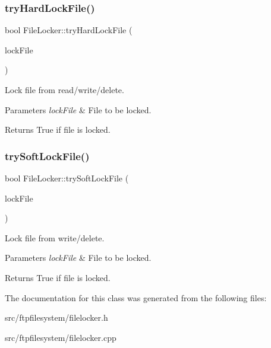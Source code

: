 \subsubsection{\texorpdfstring{try\+Hard\+Lock\+File()}{tryHardLockFile()}}
{\footnotesize\ttfamily bool File\+Locker\+::try\+Hard\+Lock\+File (\begin{DoxyParamCaption}\item[{const Q\+File\+Info \&}]{lock\+File }\end{DoxyParamCaption})\hspace{0.3cm}{\ttfamily [static]}}



Lock file from read/write/delete. 


\begin{DoxyParams}{Parameters}
{\em lock\+File} & File to be locked. \\
\hline
\end{DoxyParams}
\begin{DoxyReturn}{Returns}
True if file is locked. 
\end{DoxyReturn}
\mbox{\label{classFileLocker_a107060898062f6990b58d0cb102551ac}} 
\subsubsection{\texorpdfstring{try\+Soft\+Lock\+File()}{trySoftLockFile()}}
{\footnotesize\ttfamily bool File\+Locker\+::try\+Soft\+Lock\+File (\begin{DoxyParamCaption}\item[{const Q\+File\+Info \&}]{lock\+File }\end{DoxyParamCaption})\hspace{0.3cm}{\ttfamily [static]}}



Lock file from write/delete. 


\begin{DoxyParams}{Parameters}
{\em lock\+File} & File to be locked. \\
\hline
\end{DoxyParams}
\begin{DoxyReturn}{Returns}
True if file is locked. 
\end{DoxyReturn}


The documentation for this class was generated from the following files\+:\begin{DoxyCompactItemize}
\item 
src/ftpfilesystem/filelocker.\+h\item 
src/ftpfilesystem/filelocker.\+cpp\end{DoxyCompactItemize}
